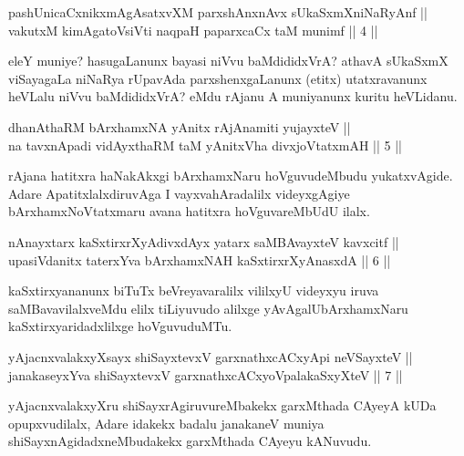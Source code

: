 \begin{shl}
pashUnicaCxnikxmAgAsatxvXM parxshAnxnAvx sUkaSxmXniNaRyAnf || \\
vakutxM kimAgatoV\s siVti naqpaH paparxcaCx taM munimf \hfill ||  4 ||  
\end{shl}

\begin{artha}
eleY muniye? hasugaLanunx bayasi niVvu baMdididxVrA? athavA sUkaSxmX viSayagaLa niNaRya rUpavAda parxshenxgaLanunx (etitx) utatxravanunx heVLalu niVvu baMdididxVrA? eMdu rAjanu A muniyanunx kuritu heVLidanu.
\end{artha}


\begin{shl}
dhanAthaRM bArxhamxNA yAnitx rAjAnamiti yujayxteV || \\
na tavxnApadi vidAyxthaRM taM yAnitxVha divxjoVtatxmAH \hfill ||  5 ||  
\end{shl}

\begin{artha}
rAjana hatitxra haNakAkxgi bArxhamxNaru hoVguvudeMbudu yukatxvAgide. Adare ApatitxlalxdiruvAga I vayxvahAradalilx videyxgAgiye bArxhamxNoVtatxmaru avana hatitxra hoVguvareMbUdU ilalx.
\end{artha}

\begin{shl}
nAnayxtarx kaSxtirxrXyAdivxdAyx yatarx saMBAvayxteV kavxcitf || \\
upasiVdanitx taterxYva bArxhamxNAH kaSxtirxrXyAnasxdA \hfill ||  6 ||  
\end{shl}

\begin{artha}
kaSxtirxyananunx biTuTx beVreyavaralilx vililxyU videyxyu iruva saMBavavilalxveMdu elilx tiLiyuvudo alilxge yAvAgalU\break bArxhamxNaru kaSxtirxyaridadxlilxge hoVguvuduMTu.
\end{artha}


\begin{shl}
yAjacnxvalakxyXsayx shiSayxtevxV garxnathxcACxyA\s pi neVSayxteV || \\
janakaseyxYva shiSayxtevxV garxnathxcACxyoVpalakaSxyXteV \hfill ||  7 ||  
\end{shl}

\begin{artha}
yAjacnxvalakxyXru shiSayxrAgiruvureMbakekx garxMthada CAyeyA kUDa opupxvudilalx, Adare idakekx badalu janakaneV muniya shiSayxnAgidadxneMbudakekx garxMthada CAyeyu kANuvudu.
\end{artha}

